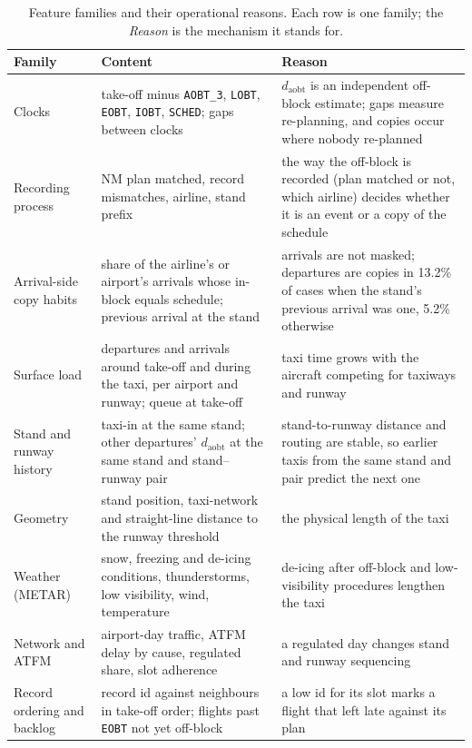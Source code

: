 \documentclass[
  manuscript=article,
  layout=preprint,
  year=2026,
  volume=x,
]{extra/joas}
\newcommand{\fld}[1]{\texttt{#1}}
\begin{document}
\begin{table}[htbp!]
  \centering
  \small
  \caption{Feature families and their operational reasons. Each row is one family; the \emph{Reason} is the mechanism it stands for.}
  \label{tb:features}
  \begin{tabular}{L{0.2\textwidth}L{0.36\textwidth}L{0.36\textwidth}}
  \toprule
  \textbf{Family} & \textbf{Content} & \textbf{Reason} \\
  \midrule
  Clocks & take-off minus \fld{AOBT\_3}, \fld{LOBT}, \fld{EOBT}, \fld{IOBT}, \fld{SCHED}; gaps between clocks & $d_{\mathrm{aobt}}$ is an independent off-block estimate; gaps measure re-planning, and copies occur where nobody re-planned \\
  Recording process & NM plan matched, record mismatches, airline, stand prefix & the way the off-block is recorded (plan matched or not, which airline) decides whether it is an event or a copy of the schedule \\
  Arrival-side copy habits & share of the airline's or airport's arrivals whose in-block equals schedule; previous arrival at the stand & arrivals are not masked; departures are copies in 13.2\% of cases when the stand's previous arrival was one, 5.2\% otherwise \\
  Surface load & departures and arrivals around take-off and during the taxi, per airport and runway; queue at take-off & taxi time grows with the aircraft competing for taxiways and runway \\
  Stand and runway history & taxi-in at the same stand; other departures' $d_{\mathrm{aobt}}$ at the same stand and stand--runway pair & stand-to-runway distance and routing are stable, so earlier taxis from the same stand and pair predict the next one \\
  Geometry & stand position, taxi-network and straight-line distance to the runway threshold & the physical length of the taxi \\
  Weather (METAR) & snow, freezing and de-icing conditions, thunderstorms, low visibility, wind, temperature & de-icing after off-block and low-visibility procedures lengthen the taxi \\
  Network and ATFM & airport-day traffic, ATFM delay by cause, regulated share, slot adherence & a regulated day changes stand and runway sequencing \\
  Record ordering and backlog & record id against neighbours in take-off order; flights past \fld{EOBT} not yet off-block & a low id for its slot marks a flight that left late against its plan \\

\end{tabular}
\end{table}
\end{document}
